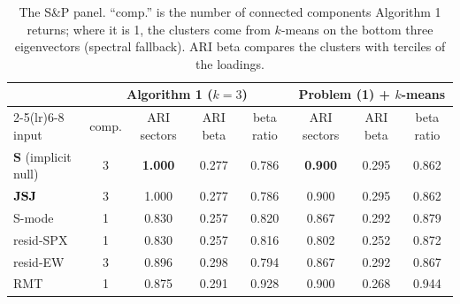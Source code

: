 \documentclass[11pt,a4paper]{article}
\newcommand{\Smat}{\mathbf{S}}
\theoremstyle{remark}
\begin{document}
\begin{table}[h]
\centering\small
\begin{tabular}{lccccccc}
\toprule
 & \multicolumn{4}{c}{Algorithm 1 ($k=3$)} & \multicolumn{3}{c}{Problem (1) + $k$-means} \\
\cmidrule(lr){2-5}\cmidrule(lr){6-8}
input & comp. & ARI sectors & ARI beta & beta ratio & ARI sectors & ARI beta & beta ratio \\
\midrule
$\Smat$ (implicit null) & 3 & \textbf{1.000} & 0.277 & 0.786 & \textbf{0.900} & 0.295 & 0.862 \\
$\Jmat\Smat\Jmat$ & 3 & 1.000 & 0.277 & 0.786 & 0.900 & 0.295 & 0.862 \\
\midrule
S-mode & 1 & 0.830 & 0.257 & 0.820 & 0.867 & 0.292 & 0.879 \\
resid-SPX & 1 & 0.830 & 0.257 & 0.816 & 0.802 & 0.252 & 0.872 \\
resid-EW & 3 & 0.896 & 0.298 & 0.794 & 0.867 & 0.292 & 0.867 \\
RMT & 1 & 0.875 & 0.291 & 0.928 & 0.900 & 0.268 & 0.944 \\
\bottomrule
\end{tabular}
\caption{The S\&P panel. ``comp.'' is the number of connected components Algorithm 1
returns; where it is 1, the clusters come from $k$-means on the bottom three
eigenvectors (spectral fallback). ARI beta compares the clusters with terciles of the
loadings.}
\label{tab:real}
\end{table}
\end{document}
